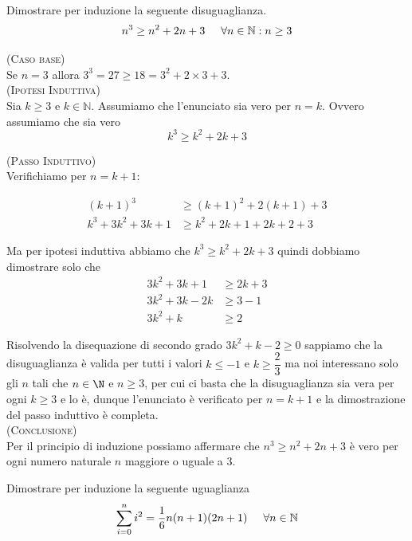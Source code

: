     
\begin{esercizio}
Dimostrare per induzione la seguente disuguaglianza. 
$$n^3 \geq n^2 + 2n + 3 \hspace{0.5cm} \forall n \in \mathbb{N} : n \geq 3$$ \end{esercizio}

\begin{soluzione}
\textsc{(Caso base)}\\		
Se $n=3$ allora $3^3 = 27 \geq 18 = 3^2 + 2 \times 3 + 3$.\\

\textsc{(Ipotesi Induttiva)}\\
Sia $k \geqslant 3$ e $k \in \mathbb{N}$. Assumiamo che l'enunciato sia vero per $n = k$. Ovvero assumiamo che sia vero $$k^3 \geq k^2 + 2k + 3$$

\textsc{(Passo Induttivo)}\\
Verifichiamo per $n = k+1$:

\begin{align*}
(k+1)^3 &\geq (k+1)^2+2(k+1)+3\\
k^3 + 3k^2 + 3k + 1  &\geq k^2+2k+1+2k+2+3
\end{align*}

Ma per ipotesi induttiva abbiamo che  $k^3 \geq k^2 + 2k + 3$ quindi dobbiamo dimostrare solo che
\begin{align*}
3k^2+3k+1 &\geq 2k+3\\
3k^2+3k-2k &\geq 3-1\\
3k^2 + k &\geq 2
\end{align*}

Risolvendo la disequazione di secondo grado $3k^2+k-2\geq 0$ sappiamo che la disuguaglianza è valida per tutti i valori $k\leq -1$ e $k\geq \dfrac{2}{3}$ ma noi interessano solo gli $n$ tali che $n\in\N$ e $n\geq 3$, per cui ci basta che la disuguaglianza sia vera per ogni $k\geq 3$ e lo è, dunque l'enunciato è verificato per $n = k+1$ e la dimostrazione del passo induttivo è completa.\\	
			
\textsc{(Conclusione)}\\
Per il principio di induzione possiamo affermare che $n^3 \geq n^2 + 2n + 3$ è vero per ogni numero naturale $n$ maggiore o uguale a 3.\\
\end{soluzione}


\begin{esercizio}    
Dimostrare per induzione la seguente uguaglianza 
$$\sum\limits_{i=0}^n i^2 = \dfrac{1}{6} n (n+1) (2n+1) \hspace{.5cm} \forall n \in \mathbb{N}$$

\end{esercizio}

